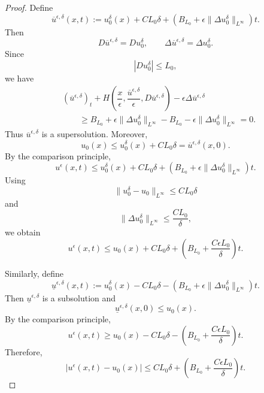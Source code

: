 \documentclass[preprint]{elsarticle}
\numberwithin{equation}{section}
\begin{document}
\begin{proof}
Define
\begin{equation*}
\overline u^{\epsilon,\delta}(x,t)
:=
u_0^\delta(x)+C L_0\delta
+
\left(
B_{L_0}
+
\epsilon\|\Delta u_0^\delta\|_{L^\infty}
\right)t.
\end{equation*}
Then
$$
D\overline u^{\epsilon,\delta}=Du_0^\delta,
\qquad
\Delta\overline u^{\epsilon,\delta}=\Delta u_0^\delta.
$$
Since
$$
|D u_0^\delta|\le L_0,
$$
we have
\begin{equation*}
\begin{aligned}
&(\overline u^{\epsilon,\delta})_t
+
H\left(
\dfrac{x}{\epsilon},
\dfrac{\overline u^{\epsilon,\delta}}{\epsilon},
D\overline u^{\epsilon,\delta}
\right)
-
\epsilon\Delta\overline u^{\epsilon,\delta}
\\
&\qquad
\ge
B_{L_0}
+
\epsilon\|\Delta u_0^\delta\|_{L^\infty}
-
B_{L_0}
-
\epsilon\|\Delta u_0^\delta\|_{L^\infty}
=
0.
\end{aligned}
\end{equation*}
Thus $\overline u^{\epsilon,\delta}$ is a supersolution. Moreover,
$$
u_0(x)\le u_0^\delta(x)+C L_0\delta
=
\overline u^{\epsilon,\delta}(x,0).
$$
By the comparison principle,
\begin{equation*}
u^\epsilon(x,t)
\le
u_0^\delta(x)+C L_0\delta
+
\left(
B_{L_0}
+
\epsilon\|\Delta u_0^\delta\|_{L^\infty}
\right)t.
\end{equation*}
Using
$$
\|u_0^\delta-u_0\|_{L^\infty}\le C L_0\delta
$$
and
$$
\|\Delta u_0^\delta\|_{L^\infty}\le \frac{C L_0}{\delta},
$$
we obtain
\begin{equation*}
u^\epsilon(x,t)
\le
u_0(x)
+
C L_0\delta
+
\left(
B_{L_0}
+
\frac{C\epsilon L_0}{\delta}
\right)t.
\end{equation*}

Similarly, define
\begin{equation*}
\underline u^{\epsilon,\delta}(x,t)
:=
u_0^\delta(x)-C L_0\delta
-
\left(
B_{L_0}
+
\epsilon\|\Delta u_0^\delta\|_{L^\infty}
\right)t.
\end{equation*}
Then $\underline u^{\epsilon,\delta}$ is a subsolution and
$$
\underline u^{\epsilon,\delta}(x,0)\le u_0(x).
$$
By the comparison principle,
\begin{equation*}
u^\epsilon(x,t)
\ge
u_0(x)
-
C L_0\delta
-
\left(
B_{L_0}
+
\frac{C\epsilon L_0}{\delta}
\right)t.
\end{equation*}
Therefore,
\begin{equation*}
|u^\epsilon(x,t)-u_0(x)|
\le
C L_0\delta
+
\left(
B_{L_0}
+
\frac{C\epsilon L_0}{\delta}
\right)t.
\end{equation*}


\end{proof}
\end{document}
